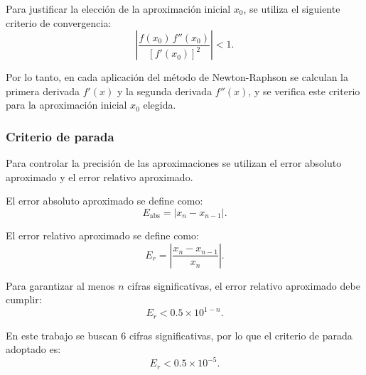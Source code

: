 Para justificar la elección de la aproximación inicial $x_0$, se utiliza el siguiente criterio de convergencia:
\begin{equation}
    \left|
    \frac{f(x_0)\,f''(x_0)}
    {[f'(x_0)]^2}
    \right| < 1.
\end{equation}

Por lo tanto, en cada aplicación del método de Newton-Raphson se calculan la primera derivada $f'(x)$ y la segunda derivada $f''(x)$, y se verifica este criterio para la aproximación inicial $x_0$ elegida.

\subsubsection{Criterio de parada}

Para controlar la precisión de las aproximaciones se utilizan el error absoluto aproximado y el error relativo aproximado.

El error absoluto aproximado se define como:
\begin{equation}
    E_{\mathrm{abs}} = \left|x_n-x_{n-1}\right|.
\end{equation}

El error relativo aproximado se define como:
\begin{equation}
    E_r =
    \left|
    \frac{x_n-x_{n-1}}{x_n}
    \right|.
\end{equation}

Para garantizar al menos $n$ cifras significativas, el error relativo aproximado debe cumplir:
\begin{equation}
    E_r < 0.5 \times 10^{1-n}.
\end{equation}

En este trabajo se buscan $6$ cifras significativas, por lo que el criterio de parada adoptado es:
\begin{equation}
    E_r < 0.5 \times 10^{-5}.
\end{equation}